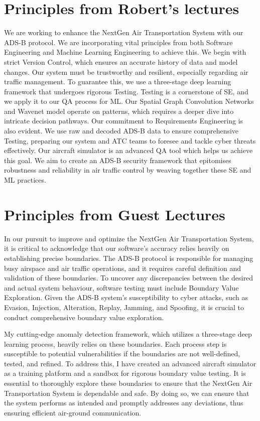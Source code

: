 \documentclass[11pt,journal,compsoc]{article}
\begin{document}
\section{Principles from Robert's lectures}
We are working to enhance the NextGen Air Transportation System with our ADS-B protocol. We are incorporating vital principles from both Software Engineering and Machine Learning Engineering to achieve this. We begin with strict Version Control, which ensures an accurate history of data and model changes. Our system must be trustworthy and resilient, especially regarding air traffic management. To guarantee this, we use a three-stage deep learning framework that undergoes rigorous Testing. Testing is a cornerstone of SE, and we apply it to our QA process for ML. Our Spatial Graph Convolution Networks and Wavenet model operate on patterns, which requires a deeper dive into intricate decision pathways. Our commitment to Requirements Engineering is also evident. We use raw and decoded ADS-B data to ensure comprehensive Testing, preparing our system and ATC teams to foresee and tackle cyber threats effectively. Our aircraft simulator is an advanced QA tool which helps us achieve this goal. We aim to create an ADS-B security framework that epitomises robustness and reliability in air traffic control by weaving together these SE and ML practices.


\section{Principles from Guest Lectures}
In our pursuit to improve and optimize the NextGen Air Transportation System, it is critical to acknowledge that our software's accuracy relies heavily on establishing precise boundaries. The ADS-B protocol is responsible for managing busy airspace and air traffic operations, and it requires careful definition and validation of these boundaries. To uncover any discrepancies between the desired and actual system behaviour, software testing must include Boundary Value Exploration. Given the ADS-B system's susceptibility to cyber attacks, such as Evasion, Injection, Alteration, Replay, Jamming, and Spoofing, it is crucial to conduct comprehensive boundary value exploration.

My cutting-edge anomaly detection framework, which utilizes a three-stage deep learning process, heavily relies on these boundaries. Each process step is susceptible to potential vulnerabilities if the boundaries are not well-defined, tested, and refined. To address this, I have created an advanced aircraft simulator as a training platform and a sandbox for rigorous boundary value testing. It is essential to thoroughly explore these boundaries to ensure that the NextGen Air Transportation System is dependable and safe. By doing so, we can ensure that the system performs as intended and promptly addresses any deviations, thus ensuring efficient air-ground communication.
\end{document}

